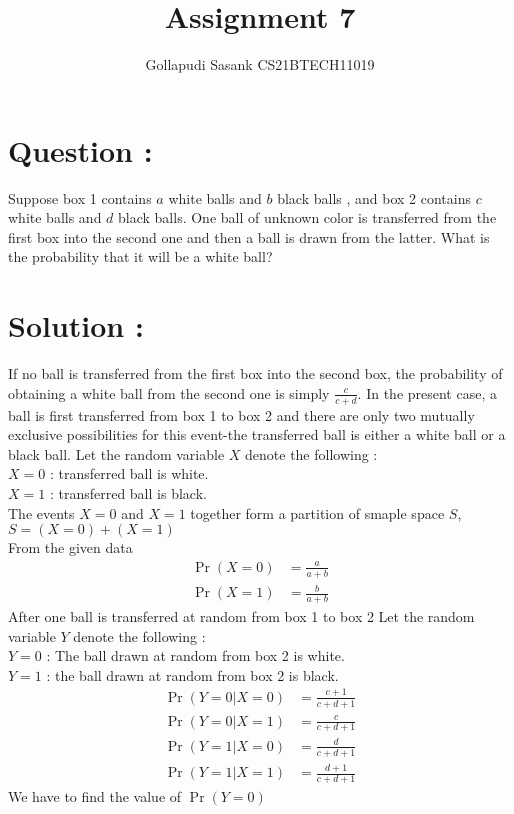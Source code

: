 \documentclass[journal,twocolumn]{IEEEtran}
\title{Assignment 7}
\author{Gollapudi Sasank CS21BTECH11019}
\providecommand{\pr}[1]{\ensuremath{\Pr\left(#1\right)}}
\begin{document}
\maketitle
\section*{Question : }
Suppose box 1 contains $a$ white balls and $b$ black balls , and box 2 contains $c$ white balls and $d$ black balls.  One ball of unknown color is transferred from the first box into the second one and then a ball is drawn from the latter. What is the probability that it will be a white ball? 
\section*{Solution : }
If no ball is transferred from the first box into the second box, the probability of obtaining a white ball from the second one is simply $\frac{c}{c + d}$. In the present case, a ball is first transferred from box 1 to box 2 and there are only two mutually exclusive possibilities  for this event-the transferred ball is either a white ball or a black ball. Let the random variable $X$ denote the following : \\
$X = 0$ : transferred ball is white. \\
$X = 1$ : transferred ball is black. \\
The events $X=0$ and $X=1$ together form a partition of smaple space $S$, $S = (X=0) + (X=1)$ \\
From the given data 
\begin{align}
    \pr{X=0} &= \frac{a}{a+b} \\
    \pr{X=1} &= \frac{b}{a+b} 
\end{align}
After one ball is transferred at random from box 1 to box 2 Let the random variable $Y$ denote the following : \\
$Y = 0$ : The ball drawn at random from box 2 is white. \\
$Y = 1$ : the ball drawn at random from box 2 is black. \\
\begin{align}
    \pr{Y=0|X=0} &= \frac{c+1}{c+d+1} \\
    \pr{Y=0|X=1} &= \frac{c}{c+d+1} \\
    \pr{Y=1|X=0} &= \frac{d}{c+d+1} \\
    \pr{Y=1|X=1} &= \frac{d+1}{c+d+1} 
\end{align}
We have to find the value of $\pr{Y=0}$ \\
\end{document}
